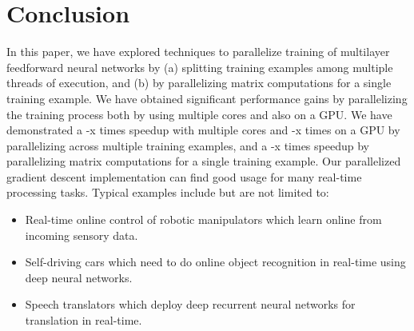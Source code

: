 \section{Conclusion}
\label{Concl}

In this paper, we have explored techniques to parallelize training of multilayer feedforward neural networks by (a) splitting training examples among multiple threads of execution, and (b) by parallelizing matrix computations for a single training example.
We have obtained significant performance gains by parallelizing the training process both by using multiple cores and also on a GPU. We have demonstrated a -x times speedup with multiple cores and -x times on a GPU by parallelizing across multiple training examples, and a -x times speedup by parallelizing matrix computations for a single training example.
Our parallelized gradient descent implementation can find good usage for many real-time processing tasks. Typical examples include but are not limited to:
\begin{itemize}
\vspace{-6pt}
\item Real-time online control of robotic manipulators which learn online from incoming sensory data.
\vspace{-4pt}
\item Self-driving cars which need to do online object recognition in real-time using deep neural networks.
\vspace{-4pt}
\item Speech translators which deploy deep recurrent neural networks for translation in real-time.
\end{itemize}